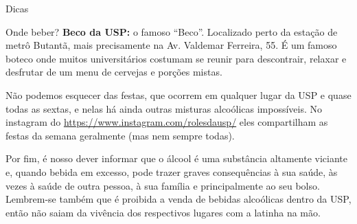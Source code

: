 \begin{secao}{Dicas}
\begin{subsecao}{Onde beber?}
{\bf Beco da USP:} o famoso ``Beco''. Localizado perto da estação de metrô
Butantã, mais precisamente na Av. Valdemar Ferreira, 55. É um famoso boteco onde
muitos universitários costumam se reunir para descontrair, relaxar e desfrutar de
um menu de cervejas e porções mistas.

Não podemos esquecer das festas, que ocorrem em qualquer lugar da USP e quase
todas as sextas, e nelas há ainda outras misturas alcoólicas impossíveis. 
No instagram do \url{https://www.instagram.com/rolesdausp/} eles compartilham as 
festas da semana geralmente (mas nem sempre todas).

Por fim, é nosso dever informar que o álcool é uma substância altamente viciante
e, quando bebida em excesso, pode trazer graves consequências à sua saúde, às
vezes à saúde de outra pessoa, à sua família e principalmente ao seu bolso.
Lembrem-se também que é proibida a venda de bebidas alcoólicas dentro da USP,
então não saiam da vivência dos respectivos lugares com a latinha na mão.

\end{subsecao}
\end{secao}
